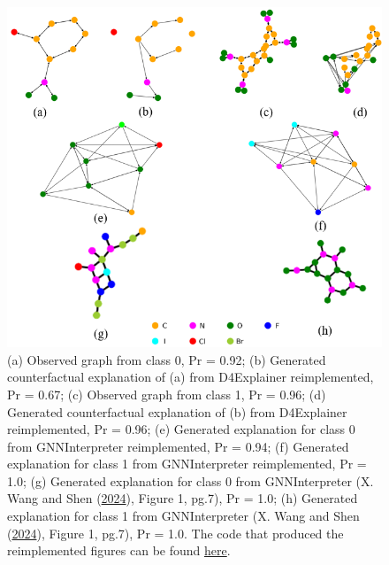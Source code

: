 \documentclass[
  11pt,
  letterpaper,
]{article}
\begin{document}
\begin{figure}

{\centering \includegraphics[width=1\textwidth,height=1\textheight]{figures/mutag_plot_together.png}

}

\caption{\label{fig-results}(a) Observed graph from class 0, Pr = 0.92;
(b) Generated counterfactual explanation of (a) from D4Explainer
reimplemented, Pr = 0.67; (c) Observed graph from class 1, Pr = 0.96;
(d) Generated counterfactual explanation of (b) from D4Explainer
reimplemented, Pr = 0.96; (e) Generated explanation for class 0 from
GNNInterpreter reimplemented, Pr = 0.94; (f) Generated explanation for
class 1 from GNNInterpreter reimplemented, Pr = 1.0; (g) Generated
explanation for class 0 from GNNInterpreter (X. Wang and Shen
(\protect\hyperlink{ref-Wang_Shen_2024}{2024}), Figure 1, pg.7), Pr =
1.0; (h) Generated explanation for class 1 from GNNInterpreter (X. Wang
and Shen (\protect\hyperlink{ref-Wang_Shen_2024}{2024}), Figure 1,
pg.7), Pr = 1.0. The code that produced the reimplemented figures can be
found
\href{https://github.com/Tiny-Quant/SuperTest/blob/master/coding/technical-details/main-notebook.ipynb}{here}.}

\end{figure}
\end{document}
